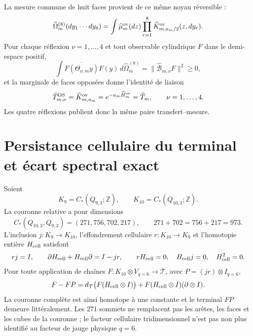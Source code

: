 La mesure commune de huit faces provient de ce même noyau réversible :
\begin{equation}\label{eq:realizaciones-ym-medida-ocho}
 \widehat\Omega_m^{(8)}(dy_1\cdots dy_8)
 =\int\widehat\mu_m^{\rm ov}(dz)
   \prod_{r=1}^{8}
   \widehat K_{m,a_m/2}^{\rm ov}(z,dy_r).
\end{equation}
Pour chaque réflexion \(\nu=1,\ldots,4\) et tout observable cylindrique \(F\)
dans le demi-espace positif,
\begin{equation}\label{eq:realizaciones-ym-os}
 \int\overline{F(\Theta_{\nu,m}y)}F(y)\,
 d\widehat\Omega_m^{(8)}
 =\|\widehat{\mathcal B}_{m,\nu}F\|^2\geq0,
\end{equation}
et la marginale de faces opposées donne l'identité de liaison
\begin{equation}\label{eq:realizaciones-ym-os-transferencia}
 \widehat T_{m,\nu}^{\rm OS}
 =\widehat K_{m,a_m}^{\rm ov}
 =e^{-a_m\widehat H_m^{\rm ov}}
 =\widehat T_m,
 \qquad \nu=1,\ldots,4.
\end{equation}
Les quatre réflexions publient donc la même paire
transfert--mesure.

\section*{Persistance cellulaire du terminal et écart spectral exact}

Soient
\[
 K_9=C_*(Q_{9,3};\mathbb Z),\qquad
 K_{10}=C_*(Q_{10,3};\mathbb Z).
\]
La couronne relative a pour dimensions
\[
 C_*(Q_{10,3},Q_{9,3})=(271,756,702,217),
 \qquad 271+702=756+217=973.
\]
L’inclusion \(j:K_9\to K_{10}\), l’effondrement cellulaire
\(r:K_{10}\to K_9\) et l’homotopie entière \(H_{\rm cell}\) satisfont
\begin{equation}\label{eq:realizaciones-ym-sdr-corona}
 rj=I,\qquad
 \partial H_{\rm cell}+H_{\rm cell}\partial=I-jr,\qquad
 rH_{\rm cell}=0,\quad H_{\rm cell}j=0,\quad H_{\rm cell}^2=0.
\end{equation}
Pour toute application de chaînes
\(F:K_{10}\otimes V_{q=6}\to\mathcal T\), avec
\(P=(jr)\otimes I_{q=6}\),
\begin{equation}\label{eq:realizaciones-ym-homotopia-terminal}
 F-FP
 =d_{\mathcal T}\bigl(F(H_{\rm cell}\otimes I)\bigr)
  +F(H_{\rm cell}\otimes I)(\partial\otimes I).
\end{equation}
La couronne complète est ainsi homotope à une constante et le terminal \(FP\) demeure littéralement. Les \(271\) sommets ne remplacent pas les arêtes, les faces et les cubes de la couronne ; le facteur cellulaire tridimensionnel n'est pas non plus identifié au facteur de jauge physique \(q=6\).

